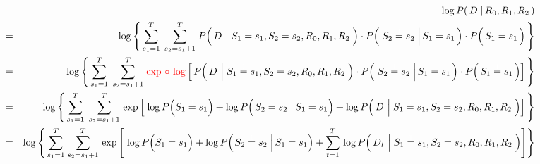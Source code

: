 \begin{eqnarray*}
&&
	\log P\!\left(\,D \;\vert\, R_{0},R_{1},R_{2}\,\right)
\\
&=&
	\log\left\{\,
		\overset{T}{\underset{s_{1}=1}{\sum}}\;\,
		\overset{T}{\underset{s_{2}=s_{1}+1}{\sum}}\;
			P\!\left(\,D\,\left\vert\;S_{1}\overset{{\color{white}1}}{=}s_{1},S_{2}=s_{2},R_{0},R_{1},R_{2}\right.\,\right)
			\cdot
			P\!\left(\,\left.S_{2}\overset{{\color{white}1}}{=}s_{2}\;\right\vert S_{1}=s_{1}\,\right)
			\cdot
			P\!\left(\,S_{1}\overset{{\color{white}1}}{=}s_{1}\,\right)
		\,\right\}
\\
&=&
	\log\left\{\,
		\overset{T}{\underset{s_{1}=1}{\sum}}\;\,
		\overset{T}{\underset{s_{2}=s_{1}+1}{\sum}}\;
		{\color{red}\exp\,\circ\,\log}
		\left[\,
			P\!\left(\,D\,\left\vert\;S_{1}\overset{{\color{white}1}}{=}s_{1},S_{2}=s_{2},R_{0},R_{1},R_{2}\right.\,\right)
			\cdot
			P\!\left(\,\left.S_{2}\overset{{\color{white}1}}{=}s_{2}\;\right\vert S_{1}=s_{1}\,\right)
			\cdot
			P\!\left(\,S_{1}\overset{{\color{white}1}}{=}s_{1}\,\right)
			\right]
		\,\right\}
\\
&=&
	\log\left\{\,
		\overset{T}{\underset{s_{1}=1}{\sum}}\;\,
		\overset{T}{\underset{s_{2}=s_{1}+1}{\sum}}\,
		\exp
		\left[\;
			\log P\!\left(S_{1}\overset{{\color{white}1}}{=}s_{1}\right)
			+
			\log P\!\left(\left.S_{2}\overset{{\color{white}1}}{=}s_{2}\;\right\vert S_{1}=s_{1}\right)
			+
			\log P\!\left(\,D\,\left\vert\;S_{1}\overset{{\color{white}1}}{=}s_{1},S_{2}=s_{2},R_{0},R_{1},R_{2}\right.\,\right)
			\right]
		\,\right\}
\\
&=&
	\log\left\{\,
		\overset{T}{\underset{s_{1}=1}{\sum}}\;
		\overset{T}{\underset{s_{2}=s_{1}+1}{\sum}}\,
		\exp
		\left[\;
			\log P\!\left(S_{1}\overset{{\color{white}1}}{=}s_{1}\right)
			+
			\log P\!\left(\left.S_{2}\overset{{\color{white}1}}{=}s_{2}\;\right\vert S_{1}=s_{1}\right)
			+
			\overset{T}{\underset{t=1}{\sum}}\,
			\log P\!\left(\,D_{t}\,\left\vert\;S_{1}\overset{{\color{white}1}}{=}s_{1},S_{2}=s_{2},R_{0},R_{1},R_{2}\right.\,\right)
			\right]
		\right\}
\end{eqnarray*}
